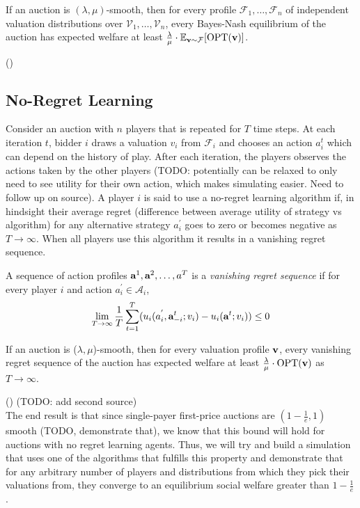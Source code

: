 \documentclass[12pt,twoside]{reedthesis}
\begin{document}
\begin{thm}
	If an auction is $(\lambda, \mu)$-smooth, then for every profile $\mathcal{F}_1, \ldots, \mathcal{F}_n$ of independent valuation distributions over $\mathcal{V}_1, \ldots, \mathcal{V}_n$, every Bayes-Nash equilibrium of the auction has expected welfare at least $\frac{\lambda}{\mu} \cdot \mathbb{E}_{\textbf{v} \sim \mathcal{F}}[\text{OPT}(\textbf{v})]$.
\end{thm}  
(\cite{Roughgarden2017})

\subsection{No-Regret Learning}
Consider an auction with $n$ players that is repeated for $T$ time steps. At each iteration $t$, bidder $i$ draws a valuation $v_i$ from $\mathcal{F}_i$ and chooses an action $a_i^t$ which can depend on the history of play. After each iteration, the players observes the actions taken by the other players (TODO: potentially can be relaxed to only need to see utility for their own action, which makes simulating easier. Need to follow up on source). A player $i$ is said to use a no-regret learning algorithm if, in hindsight their average regret (difference between average utility of strategy vs algorithm) for any alternative strategy $a_i^{'}$ goes to zero or becomes negative as $T \rightarrow \infty$. When all players use this algorithm it results in a vanishing regret sequence.

\begin{dfn}
	A sequence of action profiles $\textbf{a}^1 , \textbf{a}^2, \ldots, a^T$ is a \textit{vanishing regret sequence} if for every player $i$ and action $a_i^{'} \in \mathcal{A}_i$,
	$$ \lim\limits_{T \rightarrow \infty} \frac{1}{T} \sum_{t=1}^{T}(u_i(a_i^{'}, \textbf{a}_{-i}^{t};v_i) - u_i(\textbf{a}^t; v_i)) \leq 0$$ 
\end{dfn}

\begin{thm}
	If an auction is ($\lambda, \mu$)-smooth, then for every valuation profile $\textbf{v}$, every vanishing regret sequence of the auction has expected welfare at least $\frac{\lambda}{\mu} \cdot \text{OPT}(\textbf{v})$ as $T \rightarrow \infty$.  
\end{thm}

(\cite{Roughgarden2017}) (TODO: add second source)\\

The end result is that since single-payer first-price auctions are $(1-\frac{1}{e}, 1)$ smooth (TODO, demonstrate that), we know that this bound will hold for auctions with no regret learning agents. Thus, we will try and build a simulation that uses one of the algorithms that fulfills this property and demonstrate that for any arbitrary number of players and distributions from which they pick their valuations from, they converge to an equilibrium social welfare greater than $1-\frac{1}{e}$.
\end{document}
